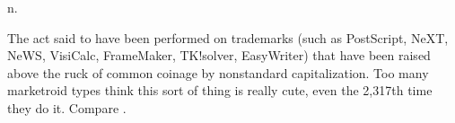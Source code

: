  n.

The act said to have been performed on trademarks (such as PostScript, NeXT,
NeWS, VisiCalc, FrameMaker, TK!solver, EasyWriter) that have been raised above
the ruck of common coinage by nonstandard capitalization. Too many marketroid
types think this sort of thing is really cute, even the 2,317th time they do it.
Compare .

